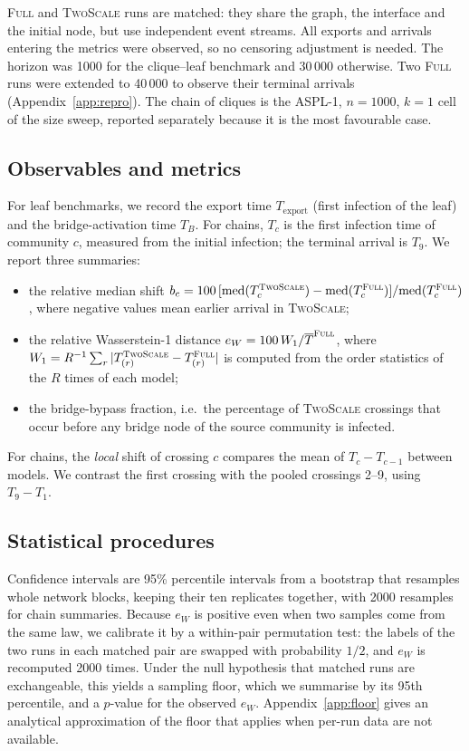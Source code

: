 \documentclass[a4paper,fleqn]{cas-sc}
\newcommand{\Full}{\textup{\textsc{Full}}}
\newcommand{\TS}{\textup{\textsc{TwoScale}}}
\newcommand{\eW}{e_{W}}
\begin{document}
\Full{} and \TS{} runs are matched: they share the graph, the interface and the initial node, but use independent event streams. All exports and arrivals entering the metrics were observed, so no censoring adjustment is needed. The horizon was 1000 for the clique--leaf benchmark and 30\,000 otherwise. Two \Full{} runs were extended to 40\,000 to observe their terminal arrivals (Appendix~\ref{app:repro}). The chain of cliques is the ASPL-1, $n=1000$, $k=1$ cell of the size sweep, reported separately because it is the most favourable case.

\subsection{Observables and metrics}

For leaf benchmarks, we record the export time $T_{\mathrm{export}}$ (first infection of the leaf) and the bridge-activation time $T_B$. For chains, $T_c$ is the first infection time of community $c$, measured from the initial infection; the terminal arrival is $T_9$. We report three summaries:
\begin{itemize}
\item the relative median shift $b_c=100\,[\mathrm{med}(T^{\TS}_c)-\mathrm{med}(T^{\Full}_c)]/\mathrm{med}(T^{\Full}_c)$, where negative values mean earlier arrival in \TS{};
\item the relative Wasserstein-1 distance $\eW=100\,W_1/\overline{T}^{\Full}$, where $W_1=R^{-1}\sum_r|T^{\TS}_{(r)}-T^{\Full}_{(r)}|$ is computed from the order statistics of the $R$ times of each model;
\item the bridge-bypass fraction, i.e.\ the percentage of \TS{} crossings that occur before any bridge node of the source community is infected.
\end{itemize}
For chains, the \emph{local} shift of crossing $c$ compares the mean of $T_c-T_{c-1}$ between models. We contrast the first crossing with the pooled crossings 2--9, using $T_9-T_1$.

\subsection{Statistical procedures}

Confidence intervals are 95\% percentile intervals from a bootstrap that resamples whole network blocks, keeping their ten replicates together, with 2000 resamples for chain summaries. Because $\eW$ is positive even when two samples come from the same law, we calibrate it by a within-pair permutation test: the labels of the two runs in each matched pair are swapped with probability $1/2$, and $\eW$ is recomputed 2000 times. Under the null hypothesis that matched runs are exchangeable, this yields a sampling floor, which we summarise by its 95th percentile, and a $p$-value for the observed $\eW$. Appendix~\ref{app:floor} gives an analytical approximation of the floor that applies when per-run data are not available.
\end{document}
